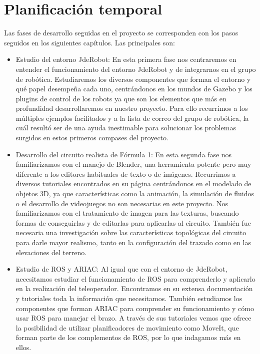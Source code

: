 \section{Planificación temporal}
\label{sec:obj_planificaciontemporal}

Las fases de desarrollo seguidas en el proyecto se corresponden con los pasos seguidos en los siguientes capítulos. Las principales son:

\begin{itemize}
	\item Estudio del entorno JdeRobot:
	En esta primera fase nos centraremos en entender el funcionamiento del entorno JdeRobot y de integrarnos en el grupo de robótica. Estudiaremos los diversos componentes que forman el entorno y qué papel desempeña cada uno, centrándonos en los mundos de Gazebo y los plugins de control de los robots ya que son los elementos que más en profundidad desarrollaremos en nuestro proyecto. Para ello recurrimos a los múltiples ejemplos facilitados y a la lista de correo del grupo de robótica, la cuál resultó ser de una ayuda inestimable para solucionar los problemas surgidos en estos primeros compases del proyecto.
	
	\item Desarrollo del circuito realista de Fórmula 1:
	En esta segunda fase nos familiarizamos con el manejo de Blender, una herramienta potente pero muy diferente a los editores habituales de texto o de imágenes. Recurrimos a diversos tutoriales encontrados en su página centrándonos en el modelado de objetos 3D, ya que características como la animación, la simulación de fluidos o el desarrollo de videojuegos no son necesarias en este proyecto. Nos familiarizamos con el tratamiento de imagen para las texturas, buscando formas de conseguirlas y de editarlas para aplicarlas al circuito. También fue necesaria una investigación sobre las características topológicas del circuito para darle mayor realismo, tanto en la configuración del trazado como en las elevaciones del terreno.
	
	\item Estudio de ROS y ARIAC:
	Al igual que con el entorno de JdeRobot, necesitamos estudiar el funcionamiento de ROS para comprenderlo y aplicarlo en la realización del teleoperador. Encontramos en su extensa documentación y tutoriales toda la información que necesitamos. También estudiamos los componentes que forman ARIAC para comprender su funcionamiento y cómo usar ROS para manejar el brazo. A través de sus tutoriales vemos que ofrece la posibilidad de utilizar planificadores de movimiento como MoveIt, que forman parte de los complementos de ROS, por lo que indagamos más en ellos.
	

\end{itemize}
